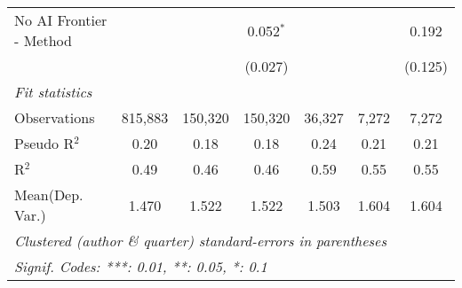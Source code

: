 \begin{tabular}{lcccccc}
   No AI Frontier - Method &              &               & 0.052$^{*}$   &         &             & 0.192\\   
                           &              &               & (0.027)       &         &             & (0.125)\\   
   \midrule
   \emph{Fit statistics}\\
   Observations            & 815,883      & 150,320       & 150,320       & 36,327  & 7,272       & 7,272\\  
   Pseudo R$^2$            & 0.20         & 0.18          & 0.18          & 0.24    & 0.21        & 0.21\\  
   R$^2$                   & 0.49         & 0.46          & 0.46          & 0.59    & 0.55        & 0.55\\  
Mean(Dep. Var.) & 1.470 & 1.522 & 1.522 & 1.503 & 1.604 & 1.604 \\
   \midrule \midrule
   \multicolumn{7}{l}{\emph{Clustered (author \& quarter) standard-errors in parentheses}}\\
   \multicolumn{7}{l}{\emph{Signif. Codes: ***: 0.01, **: 0.05, *: 0.1}}\\
\end{tabular}
\par\endgroup
